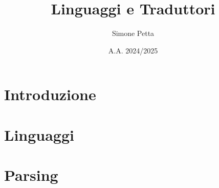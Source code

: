 \documentclass[a4paper,12pt]{report}
\title{Linguaggi e Traduttori}
\author{Simone Petta}
\date{A.A. 2024/2025}
\begin{document}
\maketitle

\chapter{Introduzione}


\chapter{Linguaggi}


\chapter{Parsing}

\end{document}
